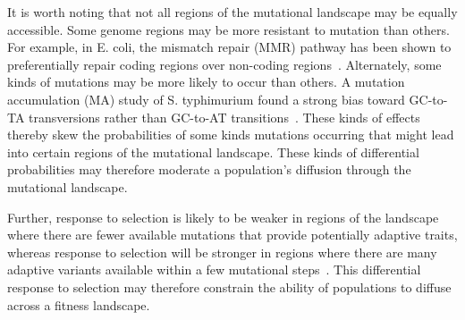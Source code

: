 \documentclass[10pt,letterpaper]{article}
\begin{document}
It is worth noting that not all regions of the mutational landscape may be equally accessible. Some genome regions may be more resistant to mutation than others. For example, in E. coli, the mismatch repair (MMR) pathway has been shown to preferentially repair coding regions over non-coding regions~\cite{lee_rate_2012}. Alternately, some kinds of mutations may be more likely to occur than others. A mutation accumulation (MA) study of S. typhimurium found a strong bias toward GC-to-TA transversions rather than GC-to-AT transitions~\cite{lind_whole-genome_2008}. These kinds of effects thereby skew the probabilities of some kinds mutations occurring that might lead into certain regions of the mutational landscape. These kinds of differential probabilities may therefore moderate a population's diffusion through the mutational landscape.
%
%

Further, response to selection is likely to be weaker in regions of the landscape where there are fewer available mutations that provide potentially adaptive traits, whereas response to selection will be stronger in regions where there are many adaptive variants available within a few mutational steps~\cite{alberch_genes_1991,carter_role_2005}. This differential response to selection may therefore constrain the ability of populations to diffuse across a fitness landscape.
\end{document}
